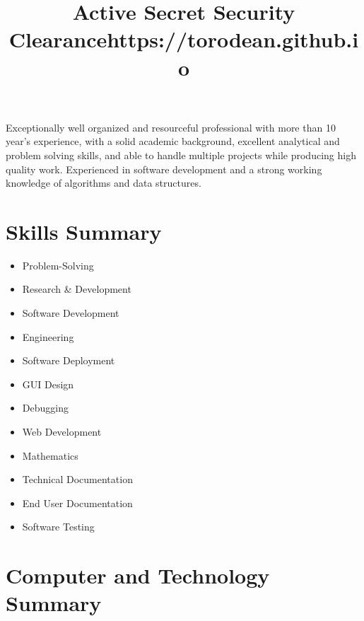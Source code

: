 \documentclass[11pt,a4paper,sans]{moderncv} %
\title{Active Secret Security Clearance\newline\newline https://torodean.github.io}
\begin{document}
\makecvtitle %


Exceptionally well organized and resourceful professional with more than 10 year’s experience, with a solid academic background, excellent analytical and problem solving skills, and able to handle multiple projects while producing high quality work. Experienced in software development and a strong working knowledge of algorithms and data structures.	


\section{Skills Summary}

\begin{multicols}{3}
	\begin{itemize}
	\item Problem-Solving
	\item Research \& Development
	\item Software Development
	\item Engineering
	\item Software Deployment
	\item GUI Design
	\item Debugging
	\item Web Development
	\item Mathematics
	\item Technical Documentation
	\item End User Documentation
	\item Software Testing
	\end{itemize}
\end{multicols}


\section{Computer and Technology Summary}
\end{document}
